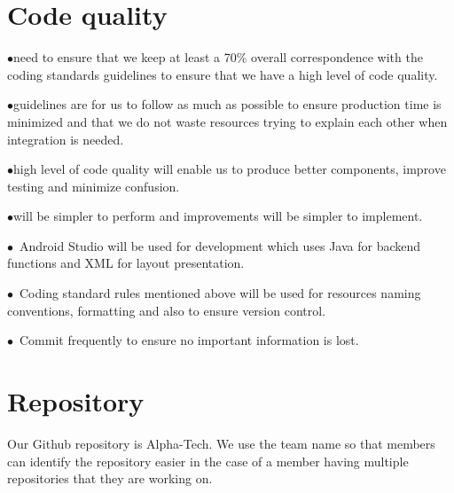 \documentclass[english]{article}
\begin{document}
\section{Code quality}
$\bullet$\We need to ensure that we keep at least a 70\% overall correspondence with the coding standards guidelines to ensure that we have a high level of code quality.\par
$\bullet$\These guidelines are for us to follow as much as possible to ensure production time is minimized and that we do not waste resources trying to explain each other when integration is needed.\par
$\bullet$\A high level of code quality will enable us to produce better components, improve testing and minimize confusion. \par 
$\bullet$\Reviews will be simpler to perform and improvements will be simpler to implement.\par
$\bullet$\ Android Studio will be used for development which uses Java for backend functions and XML for layout presentation. \par
$\bullet$\ Coding standard rules mentioned above will be used for resources naming conventions, formatting and also to ensure version control.
 \par
 $\bullet$\ Commit frequently to ensure no important information is lost.
 \par

\section{Repository}
Our Github repository is Alpha-Tech. We use the team name so that members can identify the repository easier in the case of a member having multiple repositories that they are working on. 
\end{document}
